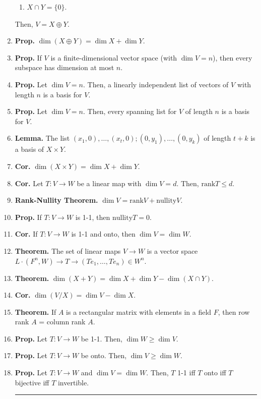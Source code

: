 \begin{enumerate}
\begin{enumerate}
		\item $X \cap Y = \{0\}$. 
	\end{enumerate}
	Then, $V=X \oplus Y$. 
	\item \textbf{Prop. } $\dim(X \oplus Y) = \dim X + \dim Y$. 
	\item \textbf{Prop. } If $V$ is a finite-dimensional vector space (with $\dim V = n$), then every subspace has dimension at most $n$. 
	\item \textbf{Prop. } Let $\dim V = n$. Then, a linearly independent list of vectors of $V$ with length $n$ is a basis for $V$. 
	\item \textbf{Prop. } Let $\dim V = n$. Then, every spanning list for $V$ of length $n$ is a basis for $V$.
	\item \textbf{Lemma. } The list $(x_1,0),\dots,(x_t,0);(0,y_1),\dots,(0,y_k)$ of length $t+k$ is a basis of $X \times Y$. 
	\item \textbf{Cor. } $\dim (X \times Y) = \dim X + \dim Y$. 
	\item \textbf{Cor. } Let $T: V \to W$ be a linear map with $\dim V = d$. Then, $\textrm{rank}T \leq d$. 
	\item \textbf{Rank-Nullity Theorem. } $\dim V = \textrm{rank}V + \textrm{nullity}V$. 
	\item \textbf{Prop. } If $T: V \to W$ is 1-1, then $\textrm{nullity}T = 0$. 
	\item \textbf{Cor. } If $T: V \to W$ is 1-1 and onto, then $\dim V = \dim W$. 
	\item \textbf{Theorem. } The set of linear maps $V \to W$ is a vector space $L \cdot (F^n,W) \to T \longrightarrow (Te_1,\dots,Te_n) \in W^n$. 
	\item \textbf{Theorem. } $\dim (X+Y) = \dim X + \dim Y - \dim (X \cap Y)$. 
	\item \textbf{Cor. } $\dim (V/X) = \dim V - \dim X$. 
	\item \textbf{Theorem. } If $A$ is a rectangular matrix with elements in a field $F$, then row rank $A$ = column rank $A$. 
	\item \textbf{Prop. } Let $T: V \to W$ be 1-1. Then, $\dim W \geq \dim V$. 
	\item \textbf{Prop. } Let $T: V \to W$ be onto. Then, $\dim V \geq \dim W$. 
	\item \textbf{Prop. } Let $T: V \to W$ and $\dim V = \dim W$. Then, $T$ 1-1 iff $T$ onto iff $T$ bijective iff $T$ invertible. 
	\begin{center}
		\hrule
	\end{center}

\end{enumerate}
